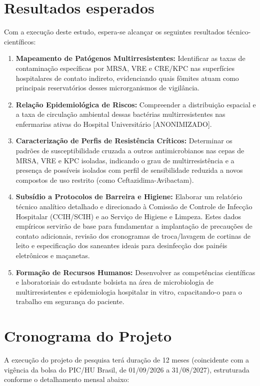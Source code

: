 \documentclass[12pt,a4paper]{article}
\begin{document}
\section{Resultados esperados}
Com a execução deste estudo, espera-se alcançar os seguintes resultados técnico-científicos:
\begin{enumerate}
    \item \textbf{Mapeamento de Patógenos Multirresistentes:} Identificar as taxas de contaminação específicas por MRSA, VRE e CRE/KPC nas superfícies hospitalares de contato indireto, evidenciando quais fômites atuam como principais reservatórios desses microrganismos de vigilância.
    \item \textbf{Relação Epidemiológica de Riscos:} Compreender a distribuição espacial e a taxa de circulação ambiental dessas bactérias multirresistentes nas enfermarias ativas do Hospital Universitário [ANONIMIZADO].
    \item \textbf{Caracterização de Perfis de Resistência Críticos:} Determinar os padrões de susceptibilidade cruzada a outros antimicrobianos nas cepas de MRSA, VRE e KPC isoladas, indicando o grau de multirresistência e a presença de possíveis isolados com perfil de sensibilidade reduzida a novos compostos de uso restrito (como Ceftazidima-Avibactam).
    \item \textbf{Subsídio a Protocolos de Barreira e Higiene:} Elaborar um relatório técnico analítico detalhado e direcionado à Comissão de Controle de Infecção Hospitalar (CCIH/SCIH) e ao Serviço de Higiene e Limpeza. Estes dados empíricos servirão de base para fundamentar a implantação de precauções de contato adicionais, revisão dos cronogramas de troca/lavagem de cortinas de leito e especificação dos saneantes ideais para desinfecção dos painéis eletrônicos e maçanetas.
    \item \textbf{Formação de Recursos Humanos:} Desenvolver as competências científicas e laboratoriais do estudante bolsista na área de microbiologia de multirresistentes e epidemiologia hospitalar in vitro, capacitando-o para o trabalho em segurança do paciente.
\end{enumerate}
\newpage

\section{Cronograma do Projeto}
A execução do projeto de pesquisa terá duração de 12 meses (coincidente com a vigência da bolsa do PIC/HU Brasil, de 01/09/2026 a 31/08/2027), estruturada conforme o detalhamento mensal abaixo:
\end{document}
